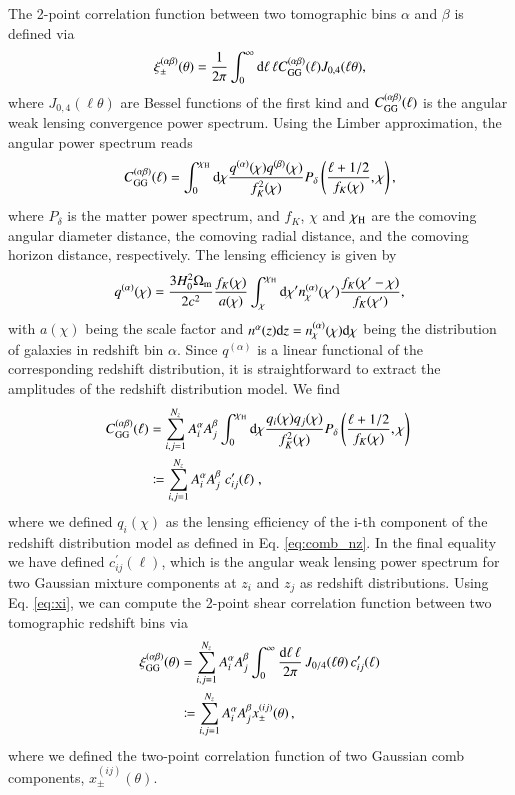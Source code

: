 \documentclass{aa}
\newcommand{\eq}[1]{\begin{equation}  #1 \end{equation}}
\newcommand{\eqa}[1]{\begin{align}   #1 \end{align}}
\newcommand{\br}[1]{\left( #1 \right)}
\newcommand{\dd}{{\rm d}}
\begin{document}
The 2-point correlation function between two tomographic bins $\alpha$ and $\beta$ is defined via
\eq{
\label{eq:xi}
\xi_\pm^{(\alpha\beta)}(\theta) = \frac{1}{2\pi}\int_0^{\infty}{\rm d}\ell\, \ell C_{\rm GG}^{(\alpha\beta)}(\ell)J_{0,4}(\ell\theta),
}
where $J_{0,4}(\ell\theta)$ are Bessel functions of the first kind and $C_{\rm GG}^{(\alpha\beta)}(\ell)$ is the angular weak lensing convergence power spectrum.
Using the Limber approximation, the angular power spectrum reads \citep{kaiser92}
\eq{
C_{\rm GG}^{(\alpha \beta)}(\ell) = \int_0^{\chi_{\rm H}} \dd \chi \frac{q^{(\alpha)}(\chi) q^{(\beta)}(\chi)}{f_K^2(\chi)} P_\delta\br{\frac{\ell+1/2}{f_K(\chi)},\chi},
}
where $P_\delta$ is the matter power spectrum, and $f_K$, $\chi$ and $\chi_{\rm H}$ are the comoving angular diameter distance, the comoving radial distance, and the comoving horizon distance, respectively. The lensing efficiency is given by
\eq{
q^{(\alpha)}(\chi) = \frac{3H_0^2\Omega_{\rm m}}{2c^2} \frac{f_K(\chi)}{a({\chi})} \int_\chi^{\chi_{\rm H}} \dd \chi^\prime n_\chi^{(\alpha)}(\chi') \frac{f_K(\chi^\prime-\chi)}{f_K(\chi^\prime)},
}
with $a(\chi)$ being the scale factor and $n^\alpha(z){\rm d}z = n_\chi^{(\alpha)}(\chi){\rm d}\chi$ being the distribution of galaxies in redshift bin $\alpha$. Since $q^{(\alpha)}$ is a linear functional of the corresponding redshift distribution, it is straightforward to extract the amplitudes of the redshift distribution model. We find
\eqa{
C_{\rm GG}^{(\alpha \beta)}(\ell) &= \sum_{i,j=1}^{N_z} A_i^\alpha A_j^\beta \int_0^{\chi_{\rm H}} \dd \chi \frac{q_i(\chi) q_j(\chi)}{f_K^2(\chi)} P_\delta\br{\frac{\ell+1/2}{f_K(\chi)},\chi}\;\\
&\coloneqq \sum_{i,j=1}^{N_z} A_i^\alpha A_j^\beta\; c^\prime_{ij}(\ell)\;,
}
where we defined $q_i(\chi)$ as the lensing efficiency of the i-th component of the redshift distribution model as defined in Eq. \eqref{eq:comb_nz}. In the final equality we have defined $c^\prime_{ij}(\ell)$, which is the angular weak lensing power spectrum for two Gaussian mixture components at $z_i$ and $z_j$ as redshift distributions. Using Eq. \eqref{eq:xi}, we can compute the 2-point shear correlation function between two tomographic redshift bins via
\eqa{
\xi_{\rm GG}^{(\alpha\beta)}(\theta) &= \sum_{i,j=1}^{N_z} A_i^\alpha A_j^\beta \int_0^\infty \frac{\dd \ell\, \ell}{2 \pi}\,J _{0/4}(\ell \theta)\, c^\prime_{ij}(\ell)\\
&\coloneqq  \sum_{i,j=1}^{N_z} A_i^\alpha A_j^\beta x_\pm^{(ij)}(\theta)\, ,\label{eq:xi_comb}
}
where we defined the two-point correlation function of two Gaussian comb components, $x_\pm^{(ij)}(\theta)$.
\end{document}
